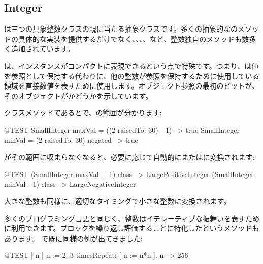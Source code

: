 \documentclass[a4paper,10pt,twoside]{book}
\begin{document}

\subsection{Integer}

は三つの具象整数クラスの親に当たる抽象クラスです。多くの抽象的なのメソッドの具体的な実装を提供するだけでなく、、、、など、整数独自のメソッドも数多く追加されています。

は、インスタンスがコンパクトに表現できるという点で特殊です。つまり、は値を参照として保持する代わりに、他の整数が参照を保持するために使用している領域を直接数値を表すために使用します。オブジェクト参照の最初のビットが、そのオブジェクトがかどうかを示しています。

クラスメソッドであるとで、の範囲が分かります:

\begin{code}{@TEST}
SmallInteger maxVal = ((2 raisedTo: 30) - 1)      --> true
SmallInteger minVal = (2 raisedTo: 30) negated --> true
\end{code}

がその範囲に収まらなくなると、必要に応じて自動的にまたはに変換されます:

\begin{code}{@TEST}
(SmallInteger maxVal + 1) class --> LargePositiveInteger
(SmallInteger minVal - 1) class  --> LargeNegativeInteger
\end{code}

大きな整数も同様に、適切なタイミングで小さな整数に変換されます。

多くのプログラミング言語と同じく、整数はイテレーティブな振舞いを表すために利用できます。ブロックを繰り返し評価することに特化したというメソッドもあります。
で既に同様の例が出てきました:
\begin{code}{@TEST | n |}
n := 2.
3 timesRepeat: [ n := n*n ].
n --> 256
\end{code}
\end{document}
